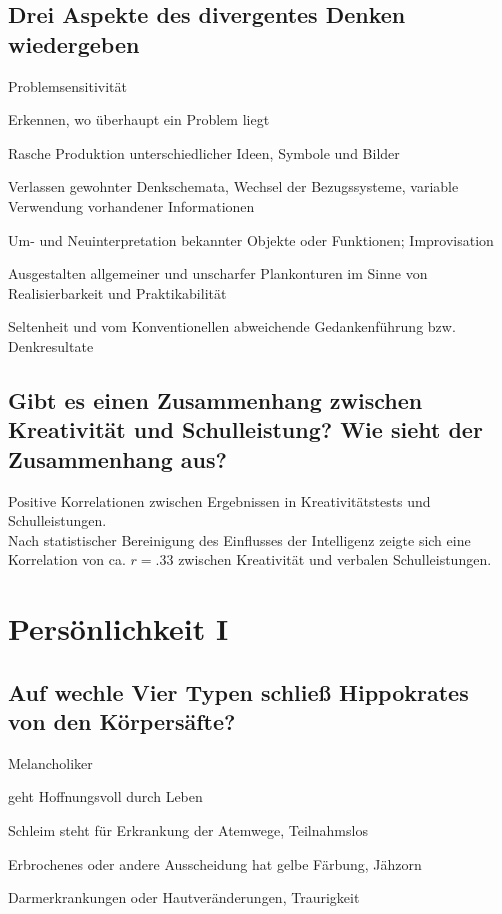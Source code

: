 \documentclass[a6paper,10pt,DIV=40]{scrartcl}
\begin{document}
\subsection{Drei Aspekte des divergentes Denken wiedergeben}
    \begin{labeling}{Problemsensitivität}
        \item [Problemsensitivität] Erkennen, wo überhaupt ein Problem liegt
        \item [Flüssigkeit] Rasche Produktion unterschiedlicher Ideen, Symbole und Bilder
        \item [Flexibilität] Verlassen gewohnter Denkschemata, Wechsel der Bezugssysteme, variable Verwendung vorhandener Informationen
        \item [Redefinition] Um- und Neuinterpretation bekannter Objekte oder Funktionen; Improvisation
        \item [Elaboration] Ausgestalten allgemeiner und unscharfer Plankonturen im Sinne von Realisierbarkeit und Praktikabilität
        \item [Originalität] Seltenheit und vom Konventionellen abweichende Gedankenführung bzw. Denkresultate
    \end{labeling}

\subsection{Gibt es einen Zusammenhang zwischen Kreativität und Schulleistung? Wie sieht der Zusammenhang aus?}
    Positive Korrelationen zwischen Ergebnissen in Kreativitätstests und Schulleistungen.\\
    Nach statistischer Bereinigung des Einflusses der Intelligenz zeigte sich eine Korrelation von ca. $r = .33$ zwischen Kreativität und verbalen Schulleistungen.

\section{Persönlichkeit I}
\subsection{Auf wechle Vier Typen schließ Hippokrates von den Körpersäfte?}
    \begin{labeling}{Melancholiker}
        \item [Sanguiniker] geht Hoffnungsvoll durch Leben
        \item [Phlegmatiker] Schleim steht für Erkrankung der Atemwege, Teilnahmslos
        \item [Choleriker] Erbrochenes oder andere Ausscheidung hat gelbe Färbung, Jähzorn
        \item [Melancholiker] Darmerkrankungen oder Hautveränderungen, Traurigkeit
    \end{labeling}
\end{document}
